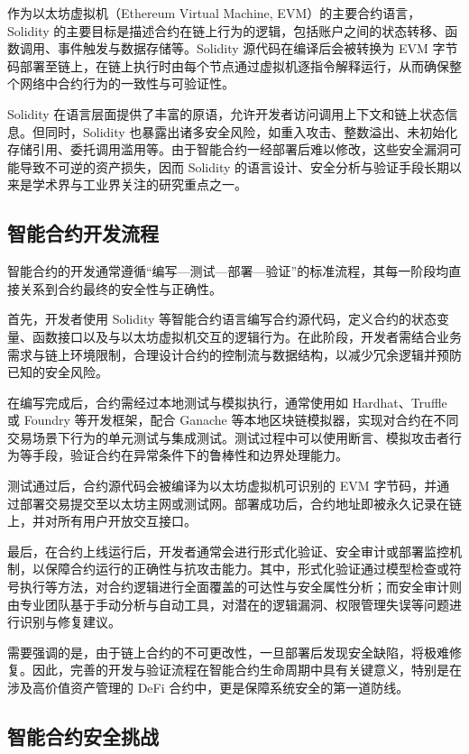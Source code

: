 \documentclass[print, master, vlined, timesmath]{DissertUESTC}
\begin{document}
作为以太坊虚拟机（Ethereum Virtual Machine, EVM）的主要合约语言，Solidity 的主要目标是描述合约在链上行为的逻辑，包括账户之间的状态转移、函数调用、事件触发与数据存储等。Solidity 源代码在编译后会被转换为 EVM 字节码部署至链上，在链上执行时由每个节点通过虚拟机逐指令解释运行，从而确保整个网络中合约行为的一致性与可验证性。

Solidity 在语言层面提供了丰富的原语，允许开发者访问调用上下文和链上状态信息\cite{}。但同时，Solidity 也暴露出诸多安全风险，如重入攻击\cite{}、整数溢出\cite{}、未初始化存储引用\cite{}、委托调用滥用\cite{}等。由于智能合约一经部署后难以修改，这些安全漏洞可能导致不可逆的资产损失，因而 Solidity 的语言设计、安全分析与验证手段长期以来是学术界与工业界关注的研究重点之一\cite{}。

\subsection{智能合约开发流程}

智能合约的开发通常遵循“编写—测试—部署—验证”的标准流程，其每一阶段均直接关系到合约最终的安全性与正确性。

首先，开发者使用 Solidity 等智能合约语言编写合约源代码，定义合约的状态变量、函数接口以及与以太坊虚拟机交互的逻辑行为。在此阶段，开发者需结合业务需求与链上环境限制，合理设计合约的控制流与数据结构，以减少冗余逻辑并预防已知的安全风险。

在编写完成后，合约需经过本地测试与模拟执行，通常使用如 Hardhat\cite{}、Truffle\cite{} 或 Foundry\cite{} 等开发框架，配合 Ganache\cite{} 等本地区块链模拟器，实现对合约在不同交易场景下行为的单元测试与集成测试。测试过程中可以使用断言、模拟攻击者行为等手段，验证合约在异常条件下的鲁棒性和边界处理能力。

测试通过后，合约源代码会被编译为以太坊虚拟机可识别的 EVM 字节码，并通过部署交易提交至以太坊主网或测试网。部署成功后，合约地址即被永久记录在链上，并对所有用户开放交互接口。

最后，在合约上线运行后，开发者通常会进行形式化验证\cite{}、安全审计\cite{}或部署监控机制\cite{}，以保障合约运行的正确性与抗攻击能力。其中，形式化验证通过模型检查或符号执行等方法，对合约逻辑进行全面覆盖的可达性与安全属性分析；而安全审计则由专业团队基于手动分析与自动工具，对潜在的逻辑漏洞、权限管理失误等问题进行识别与修复建议。

需要强调的是，由于链上合约的不可更改性，一旦部署后发现安全缺陷，将极难修复。因此，完善的开发与验证流程在智能合约生命周期中具有关键意义，特别是在涉及高价值资产管理的 DeFi 合约中，更是保障系统安全的第一道防线。

\subsection{智能合约安全挑战}
\end{document}
